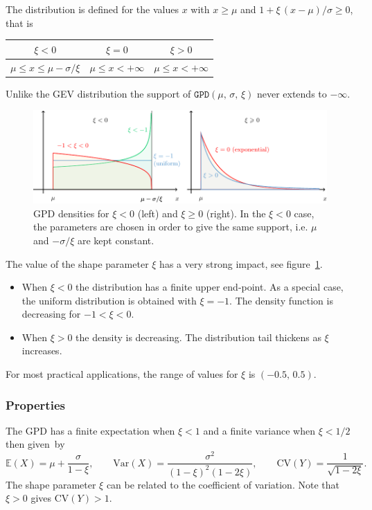 \documentclass[a4paper]{report}
\newcommand{\Esp}{\mathbb{E}}
\newcommand{\Var}{\textrm{Var}}
\begin{document}
The distribution  is defined for the values $x$ with $x \geqslant \mu$
and $1 + \xi \,(x-\mu)/\sigma \geqslant 0$, that is
\begin{center}
   \small
  \begin{tabular}{c | c | c}
    $\xi < 0$ & $\xi = 0$ & $\xi >0$ \\ \hline
   \rule{0pt}{11pt} $\mu \leqslant  x \leqslant  \mu- \sigma/\xi$ &
    $\mu \leqslant  x < +\infty$ &
    $\mu \leqslant  x  < +\infty$ 
  \end{tabular}
\end{center}
Unlike the GEV distribution the support of $\texttt{GPD}(\mu,\,\sigma,\,\xi)$ 
never extends to $-\infty$.

\begin{figure}
  \centering
  \includegraphics[width=14cm]{images/GPD.pdf}
  \caption{\label{GPDDENS} GPD densities for $\xi <0$ (left) and $\xi \geqslant 0$ (right).
    In the $\xi < 0$ case, the parameters are chosen in order to
    give the same support, i.e. $\mu$ and $-\sigma/\xi$ are kept constant.}
\end{figure}

The value of the shape parameter $\xi$ has a very strong impact, see
figure~\ref{GPDDENS}.

\begin{itemize}
\item When $\xi < 0$ the distribution has a finite upper end-point. 
  As a special case, the uniform 
  distribution is obtained with $\xi = -1$. The density function
  is decreasing for $ -1 < \xi <0$.
  
\item When $\xi >0$ the density is decreasing.
  The distribution tail thickens as $\xi$ increases.
\end{itemize}
For most practical applications, the range of values for $\xi$ is $(-0.5,\,0.5)$.

     
\subsubsection*{Properties}
\label{GPDPROP}
The GPD has a finite expectation when $\xi < 1$ and a finite variance 
when $\xi < 1/2$ then given~by
$$ 
    \Esp(X) = \mu + \frac{\sigma}{1-\xi}, \qquad 
    \Var(X) = \frac{\sigma^2}{(1-\xi)^2(1-2\xi)}, \qquad
    \textrm{CV}(Y)= \frac{1}{\sqrt{1-2\xi}}.
$$
The shape parameter $\xi$ can be related to the coefficient of variation.
Note that $\xi>0$ gives $\textrm{CV}(Y)>1$.
\end{document}

